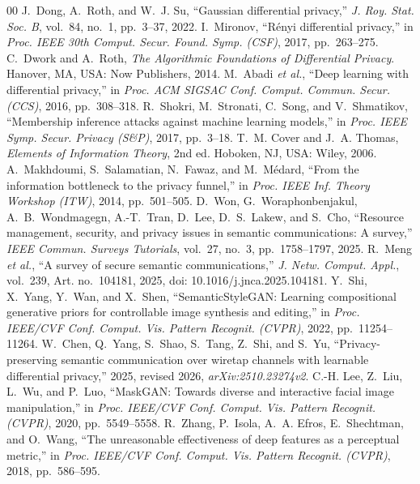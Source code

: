 \documentclass{ieeetj}
\theoremstyle{plain}
\theoremstyle{definition}
\begin{document}
\begin{thebibliography}{00}
 J.~Dong, A.~Roth, and W.~J. Su,
``Gaussian differential privacy,'' \emph{J. Roy. Stat. Soc. B}, vol.~84,
no.~1, pp.~3--37, 2022.
 I.~Mironov, ``R\'enyi differential privacy,'' in
\emph{Proc. IEEE 30th Comput. Secur. Found. Symp. (CSF)}, 2017, pp.~263--275.
 C.~Dwork and A.~Roth, \emph{The Algorithmic Foundations of
Differential Privacy}. Hanover, MA, USA: Now Publishers, 2014.
 M.~Abadi \emph{et al.}, ``Deep learning with differential
privacy,'' in \emph{Proc. ACM SIGSAC Conf. Comput. Commun. Secur. (CCS)}, 2016,
pp.~308--318.
 R.~Shokri, M.~Stronati, C.~Song, and V.~Shmatikov,
``Membership inference attacks against machine learning models,'' in
\emph{Proc. IEEE Symp. Secur. Privacy (S\&P)}, 2017, pp.~3--18.
 T.~M. Cover and J.~A. Thomas, \emph{Elements of Information
Theory}, 2nd ed. Hoboken, NJ, USA: Wiley, 2006.
 A.~Makhdoumi, S.~Salamatian, N.~Fawaz, and M.~M\'edard,
``From the information bottleneck to the privacy funnel,'' in \emph{Proc. IEEE
Inf. Theory Workshop (ITW)}, 2014, pp.~501--505.
 D.~Won, G.~Woraphonbenjakul, A.~B.~Wondmagegn,
A.-T.~Tran, D.~Lee, D.~S.~Lakew, and S.~Cho, ``Resource management, security,
and privacy issues in semantic communications: A survey,'' \emph{IEEE Commun.
Surveys Tutorials}, vol.~27, no.~3, pp.~1758--1797, 2025.
 R.~Meng \emph{et al.}, ``A survey of secure semantic
communications,'' \emph{J. Netw. Comput. Appl.}, vol.~239, Art. no.~104181,
2025, doi: 10.1016/j.jnca.2025.104181.
 Y.~Shi, X.~Yang, Y.~Wan, and X.~Shen,
``SemanticStyleGAN: Learning compositional generative priors for controllable
image synthesis and editing,'' in \emph{Proc. IEEE/CVF Conf. Comput. Vis.
Pattern Recognit. (CVPR)}, 2022, pp.~11254--11264.
 W.~Chen, Q.~Yang, S.~Shao, S.~Tang, Z.~Shi, and S.~Yu,
``Privacy-preserving semantic communication over wiretap channels with learnable
differential privacy,'' 2025, revised 2026, \emph{arXiv:2510.23274v2}.
 C.-H. Lee, Z.~Liu, L.~Wu, and P.~Luo, ``MaskGAN:
Towards diverse and interactive facial image manipulation,'' in \emph{Proc.
IEEE/CVF Conf. Comput. Vis. Pattern Recognit. (CVPR)}, 2020, pp.~5549--5558.
 R.~Zhang, P.~Isola, A.~A. Efros, E.~Shechtman, and O.~Wang,
``The unreasonable effectiveness of deep features as a perceptual metric,'' in
\emph{Proc. IEEE/CVF Conf. Comput. Vis. Pattern Recognit. (CVPR)}, 2018,
pp.~586--595.
\end{thebibliography}
\end{document}
